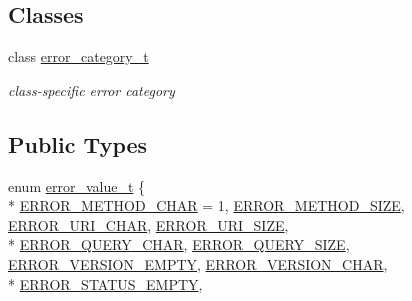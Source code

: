 \subsection*{Classes}
\begin{DoxyCompactItemize}
\item 
class \hyperlink{classpion_1_1http_1_1parser_1_1error__category__t}{error\-\_\-category\-\_\-t}
\begin{DoxyCompactList}\small\item\em class-\/specific error category \end{DoxyCompactList}\end{DoxyCompactItemize}
\subsection*{Public Types}
\begin{DoxyCompactItemize}
\item 
enum \hyperlink{classpion_1_1http_1_1parser_a056c791c4b2dda0dd4c2037dd941d5d8}{error\-\_\-value\-\_\-t} \{ \\*
\hyperlink{classpion_1_1http_1_1parser_a056c791c4b2dda0dd4c2037dd941d5d8a0cc5469207de11a5179956d3d17a8ab1}{E\-R\-R\-O\-R\-\_\-\-M\-E\-T\-H\-O\-D\-\_\-\-C\-H\-A\-R} = 1, 
\hyperlink{classpion_1_1http_1_1parser_a056c791c4b2dda0dd4c2037dd941d5d8a1462b9df44708776a05f5601f42846a8}{E\-R\-R\-O\-R\-\_\-\-M\-E\-T\-H\-O\-D\-\_\-\-S\-I\-Z\-E}, 
\hyperlink{classpion_1_1http_1_1parser_a056c791c4b2dda0dd4c2037dd941d5d8a54942737d9dda2528f9061cabc407fe9}{E\-R\-R\-O\-R\-\_\-\-U\-R\-I\-\_\-\-C\-H\-A\-R}, 
\hyperlink{classpion_1_1http_1_1parser_a056c791c4b2dda0dd4c2037dd941d5d8ab567f2418ac85f479280135441a5a390}{E\-R\-R\-O\-R\-\_\-\-U\-R\-I\-\_\-\-S\-I\-Z\-E}, 
\\*
\hyperlink{classpion_1_1http_1_1parser_a056c791c4b2dda0dd4c2037dd941d5d8a4f9ae6c0f7de1da68c85795429afda14}{E\-R\-R\-O\-R\-\_\-\-Q\-U\-E\-R\-Y\-\_\-\-C\-H\-A\-R}, 
\hyperlink{classpion_1_1http_1_1parser_a056c791c4b2dda0dd4c2037dd941d5d8aad97a47e56d77fc8d7e46a587e70e0ed}{E\-R\-R\-O\-R\-\_\-\-Q\-U\-E\-R\-Y\-\_\-\-S\-I\-Z\-E}, 
\hyperlink{classpion_1_1http_1_1parser_a056c791c4b2dda0dd4c2037dd941d5d8a35a28be377bf93eba3edaa51b0ab6a9c}{E\-R\-R\-O\-R\-\_\-\-V\-E\-R\-S\-I\-O\-N\-\_\-\-E\-M\-P\-T\-Y}, 
\hyperlink{classpion_1_1http_1_1parser_a056c791c4b2dda0dd4c2037dd941d5d8a640437b0cc21cccc547a3f838d9bdd10}{E\-R\-R\-O\-R\-\_\-\-V\-E\-R\-S\-I\-O\-N\-\_\-\-C\-H\-A\-R}, 
\\*
\hyperlink{classpion_1_1http_1_1parser_a056c791c4b2dda0dd4c2037dd941d5d8a0ee250337cb43c76158f6094f6f273fc}{E\-R\-R\-O\-R\-\_\-\-S\-T\-A\-T\-U\-S\-\_\-\-E\-M\-P\-T\-Y}, 

\end{DoxyCompactItemize}
